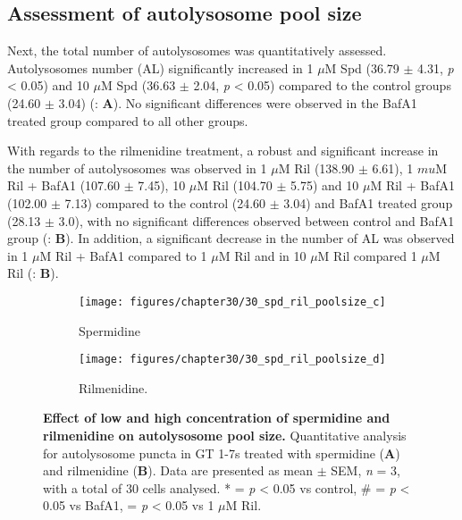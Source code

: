 {\subsection{Assessment of autolysosome pool size}
Next, the total number of autolysosomes was quantitatively assessed.  Autolysosomes number (AL) significantly increased in 1 $\mu$M Spd (36.79 $\pm$ 4.31, \textit{p} < 0.05) and 10 $\mu$M Spd (36.63 $\pm$ 2.04, \textit{p} < 0.05) compared to the control groups (24.60 $\pm$ 3.04) (: \textbf{A}). No significant differences were observed in the BafA1 treated group compared to all other groups.

With regards to the rilmenidine treatment, a robust and significant increase in the number of autolysosomes was observed in 1 $\mu$M Ril (138.90 $\pm$ 6.61), 1 $mu$M Ril + BafA1 (107.60 $\pm$ 7.45), 10 $\mu$M Ril (104.70 $\pm$ 5.75) and 10 $\mu$M Ril + BafA1 (102.00 $\pm$ 7.13) compared to the control (24.60 $\pm$ 3.04) and BafA1 treated group (28.13 $\pm$ 3.0), with no significant differences observed between control and BafA1 group (: \textbf{B}). In addition, a significant decrease in the number of AL was observed in 1 $\mu$M Ril + BafA1 compared to 1 $\mu$M Ril and in 10 $\mu$M Ril compared 1 $\mu$M Ril (: \textbf{B}).

\begin{figure}[!htbp]
  \begin{subfigure}[b]{0.495\linewidth}
    \texttt{[image: figures/chapter30/30\_spd\_ril\_poolsize\_c]}
    \caption{Spermidine}
  \end{subfigure}
  \begin{subfigure}[b]{0.495\linewidth}
    \texttt{[image: figures/chapter30/30\_spd\_ril\_poolsize\_d]}
    \caption{Rilmenidine.}
  \end{subfigure}
  \caption[Effect of a low and high concentration of spermidine and rilmenidine on autolysosome pool size]{\textbf{Effect of low and high concentration of spermidine and rilmenidine on autolysosome pool size.} Quantitative analysis for autolysosome puncta in GT 1-7s treated with spermidine (\textbf{A}) and rilmenidine (\textbf{B}). Data are presented as mean $\pm$ SEM, \textit{n} = 3, with a total of 30 cells analysed. * = \textit{p} < 0.05 vs control, \# = \textit{p} < 0.05 vs BafA1, \@ = \textit{p} < 0.05 vs 1 $\mu$M Ril.}
  \label{fig:30_spd_ril_poolsize2}
\end{figure}

}
